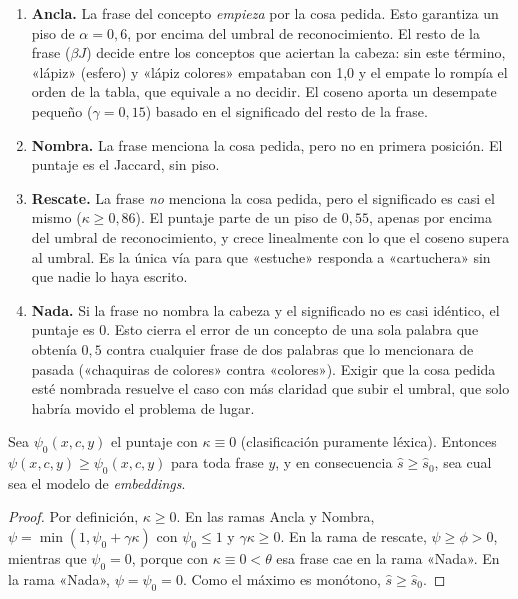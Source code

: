 \begin{enumerate}
  \item \textbf{Ancla.} La frase del concepto \emph{empieza} por la cosa
        pedida. Esto garantiza un piso de $\alpha=0{,}6$, por encima del
        umbral de reconocimiento. El resto de la frase ($\beta J$) decide entre
        los conceptos que aciertan la cabeza: sin este término, «lápiz»
        (esfero) y «lápiz colores» empataban con 1,0 y el empate lo rompía el
        orden de la tabla, que equivale a no decidir. El coseno aporta un
        desempate pequeño ($\gamma=0{,}15$) basado en el significado del resto
        de la frase.
  \item \textbf{Nombra.} La frase menciona la cosa pedida, pero no en primera
        posición. El puntaje es el Jaccard, sin piso.
  \item \textbf{Rescate.} La frase \emph{no} menciona la cosa pedida, pero el
        significado es casi el mismo ($\kappa\geq0{,}86$). El puntaje parte de
        un piso de $0{,}55$, apenas por encima del umbral de reconocimiento, y
        crece linealmente con lo que el coseno supera al umbral. Es la única
        vía para que «estuche» responda a «cartuchera» sin que nadie lo haya
        escrito.
  \item \textbf{Nada.} Si la frase no nombra la cabeza y el significado no es
        casi idéntico, el puntaje es 0. Esto cierra el error de un concepto de
        una sola palabra que obtenía $0{,}5$ contra cualquier frase de dos
        palabras que lo mencionara de pasada («chaquiras de colores» contra
        «colores»). Exigir que la cosa pedida esté nombrada resuelve el caso
        con más claridad que subir el umbral, que solo habría movido el
        problema de lugar.
\end{enumerate}

\begin{proposicion}
\label{prop:hibrido-lexico}
Sea $\psi_0(x,c,y)$ el puntaje con $\kappa\equiv0$ (clasificación puramente
léxica). Entonces $\psi(x,c,y)\geq\psi_0(x,c,y)$ para toda frase $y$, y en
consecuencia $\hat s\geq\hat s_0$, sea cual sea el modelo de
\emph{embeddings}.
\end{proposicion}

\begin{proof}
Por definición, $\kappa\geq0$. En las ramas Ancla y Nombra,
$\psi=\min(1,\psi_0+\gamma\kappa)$ con $\psi_0\leq1$ y $\gamma\kappa\geq0$. En
la rama de rescate, $\psi\geq\phi>0$,
mientras que $\psi_0=0$, porque con $\kappa\equiv0<\theta$ esa frase cae en la
rama «Nada». En la rama «Nada», $\psi=\psi_0=0$. Como el máximo es monótono,
$\hat s\geq\hat s_0$.
\end{proof}

